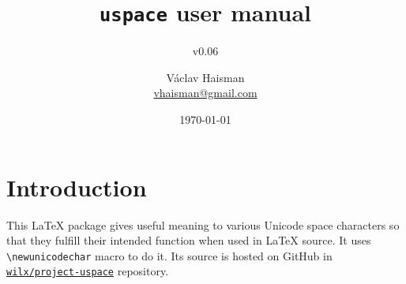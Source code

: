 \documentclass[paper=B5,DIV=calc,parskip=half]{scrartcl}
\author{Václav Haisman\texorpdfstring{%
    \\{\small\href{mailto:vhaisman+uspace@gmail.com?subject=[uspace]}{vhaisman@gmail.com}}}{}}
\date{\today}
\title{\texttt{uspace} user manual}
\subtitle{v0.06}
\begin{document}
\begin{titlepage}
  \maketitle
\end{titlepage}

\tableofcontents

\section{Introduction}%
%
This \LaTeX{} package gives useful meaning to various Unicode space
characters so that they fulfill their intended function when used in \LaTeX{}
source. It uses \lstinline|\newunicodechar| macro to do it. Its source is
hosted on GitHub in
\texttt{\href{https://github.com/wilx/project-uspace}{wilx/project-uspace}}
repository.
\end{document}

